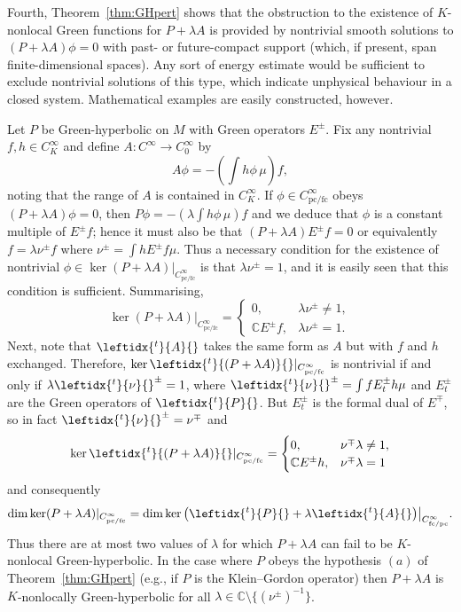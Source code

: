 \documentclass[pdftex]{sigma}
\numberwithin{equation}{section}
\newcommand{\CC}{{\mathbb C}}
\newcommand{\fc}{\mathrm{fc}}
\newcommand{\pc}{\mathrm{pc}}
\newcommand{\adj}[1]{\leftidx{^{t}}{#1}{}}
\begin{document}
 Fourth, Theorem~\ref{thm:GHpert} shows that the obstruction to the existence of $K$-nonlocal Green functions for $P+\lambda A$ is provided by nontrivial smooth solutions to $(P+\lambda A)\phi=0$ with past- or future-compact support (which, if present, span finite-dimensional spaces). Any sort of energy estimate would be sufficient to exclude nontrivial solutions of this type, which indicate unphysical behaviour in a closed system. Mathematical examples are easily constructed, however.
 \begin{Example}
 	Let $P$ be Green-hyperbolic on $M$ with Green operators $E^\pm$. Fix any nontrivial $f,h\in C^\infty_K$ and
 	define $A\colon C^\infty\to C_0^\infty$ by
 	\begin{equation*}
 		A \phi =- \left(\int h \phi\, \mu \right)f,
 	\end{equation*}
 	noting that the range of $A$ is contained in $C^\infty_K$.
 	If $\phi\in C^\infty_{\pc/\fc}$ obeys $(P+\lambda A)\phi=0$, then $P\phi = -(\lambda \int h\phi\,\mu)f$ and
 	we deduce that $\phi$ is a constant multiple of $E^\pm f$; hence it must also be that $(P+\lambda A)E^\pm f=0$ or equivalently $f = \lambda \nu^\pm f$ where
 	$\nu^\pm = \int h E^\pm f\mu$. Thus a necessary condition for the existence of nontrivial $\phi\in\ker (P+\lambda A)|_{C^\infty_{\pc/\fc}}$ is that $\lambda \nu^\pm=1$, and it is easily seen that this condition is sufficient. Summarising,
 	\begin{equation*}
 		\ker(P+\lambda A)|_{C^\infty_{\pc/\fc}}= \begin{cases} 0, & \lambda\nu^{\pm}\neq 1, \\
 			\CC E^{\pm}f, & 	\lambda\nu^{\pm}= 1.
 		\end{cases}
 	\end{equation*}
 	Next, note that $\adj{A}$ takes the same form as $A$ but with $f$ and $h$ exchanged. Therefore,
 	$\ker \adj{(P+\lambda A)}|_{C^\infty_{\pc/\fc}}$ is nontrivial if and only if
 	$\lambda \adj{\nu}^\pm = 1$, where $\adj{\nu}^\pm= \int f E_t^\pm h\mu$ and $E_t^\pm$ are the Green operators of $\adj{P}$. But $E_t^\pm$ is the formal dual of $E^\mp$, so in fact $\adj{\nu}^\pm = \nu^\mp$ and
 	\begin{equation*}
 		\ker\adj{(P+\lambda A)}|_{C^\infty_{\pc/\fc}}= \begin{cases} 0, & \nu^{\mp}\lambda\neq 1, \\
 			\CC E^{\pm}h, & 	 \nu^{\mp}\lambda= 1
 		\end{cases}
 	\end{equation*}
 	and consequently
 	\begin{equation*}
 		\dim\ker (P+ \lambda A)|_{C^\infty_{\pc/\fc}} = \dim\ker \big(\adj{P} +\lambda \adj{A}\big)\big|_{C^\infty_{\fc/\pc}} .
 	\end{equation*}
 	Thus there are at most two values of $\lambda$ for which $P+\lambda A$ can fail to be $K$-nonlocal Green-hyperbolic.
 	In the case where $P$ obeys the hypothesis $(a)$ of Theorem~\ref{thm:GHpert} (e.g., if $P$ is the Klein--Gordon operator) then $P+\lambda A$ is $K$-nonlocally Green-hyperbolic for all $\lambda\in\CC\setminus \big\{(\nu^\pm)^{-1}\big\}$.
 \end{Example}	
\end{document}

